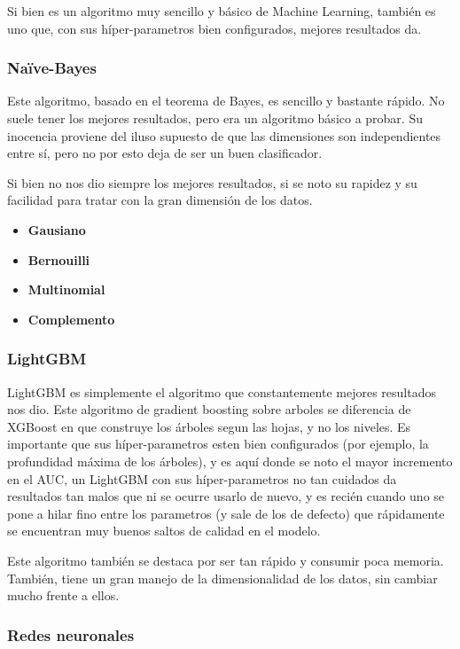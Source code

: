 \documentclass[a4paper]{article}
\begin{document}
Si bien es un algoritmo muy sencillo y básico de Machine Learning, también es uno que, con sus híper-parametros bien configurados, mejores resultados da. 

\subsubsection{Naïve-Bayes}

Este algoritmo, basado en el teorema de Bayes, es sencillo y bastante rápido. No suele tener los mejores resultados, pero era un algoritmo básico a probar. Su inocencia proviene del iluso supuesto de que las dimensiones son independientes entre sí, pero no por esto deja de ser un buen clasificador.

Si bien no nos dio siempre los mejores resultados, si se noto su rapidez y su facilidad para tratar con la gran dimensión de los datos.

\begin{itemize}
	\item \textbf{Gausiano}
	\item \textbf{Bernouilli}
	\item \textbf{Multinomial}
 	\item \textbf{Complemento}
\end{itemize}

\subsubsection{LightGBM}

LightGBM es simplemente el algoritmo que constantemente mejores resultados nos dio. Este algoritmo de gradient boosting sobre arboles se diferencia de XGBoost en que construye los árboles segun las hojas, y no los niveles. Es importante que sus híper-parametros esten bien configurados (por ejemplo, la profundidad máxima de los árboles), y es aquí donde se noto el mayor incremento en el AUC, un LightGBM con sus híper-parametros no tan cuidados da resultados tan malos que ni se ocurre usarlo de nuevo, y es recién cuando uno se pone a hilar fino entre los parametros (y sale de los de defecto) que rápidamente se encuentran muy buenos saltos de calidad en el modelo.

Este algoritmo también se destaca por ser tan rápido y consumir poca memoria. También, tiene un gran manejo de la dimensionalidad de los datos, sin cambiar mucho frente a ellos.

\subsubsection{Redes neuronales}
\end{document}
